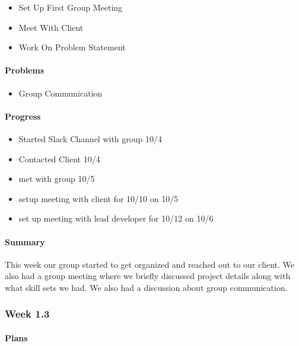 \documentclass[onecolumn, draftclsnofoot,10pt, compsoc]{article}
\begin{document}
		    \begin{itemize}
		        \item Set Up First Group Meeting
		        \item Meet With Client
		        \item Work On Problem Statement
		    \end{itemize}
		
		    \paragraph{Problems} \hfill \break
		    
		    \begin{itemize}
		        \item Group Communication 
		    \end{itemize}
		    
		    \paragraph{Progress} \hfill \break
		    \begin{itemize}
		        \item Started Slack Channel with group 10/4
		        \item Contacted Client 10/4
		        \item met with group 10/5
		        \item setup meeting with client for 10/10 on 10/5
		        \item set up meeting with lead developer for 10/12 on 10/6
		    \end{itemize}
		    
		    \paragraph{Summary} \hfill \break
		         This week our group started to get organized and reached out to our client. We also had a group meeting where we briefly discussed project details along with what skill sets we had. We also had a discussion about group communication.\\
		         
		\subsubsection{Week 1.3}
		
		    \paragraph{Plans} \hfill \break
		        
\end{document}
